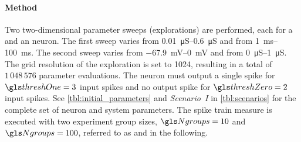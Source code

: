\paragraph{Method}
Two two-dimensional parameter sweeps (explorations) are performed, each for a \LIF and an \AdEx neuron. The first sweep varies \Gl from \SIrange{0.01}{0.6}{\micro\siemens} and \TauE from \SIrange{1}{100}{\milli\second}. The second sweep varies \ETh from \SIrange{-67.9}{0}{\milli\volt} and \wsyn from \SIrange{0}{1}{\micro\siemens}. The grid resolution of the exploration is set to 1024, resulting in a total of $1\,048\,576$ parameter evaluations. The neuron must output a single spike for $\threshOne = 3$ input spikes and no output spike for $\threshZero = 2$ input spikes. See \cref{tbl:initial_parameters} and \emph{Scenario~I} in \cref{tbl:scenarios} for the complete set of neuron and system parameters. The spike train measure is executed with two experiment group sizes, $\Ngroups = 10$ and $\Ngroups = 100$, referred to as \STI and \STII in the following.

